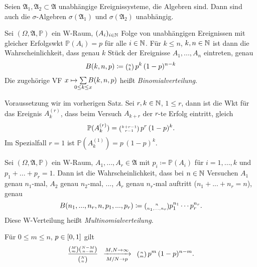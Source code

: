 \documentclass{cheat-sheet}
\newcommand{\Alg}{\mathfrak{A}} %
\renewcommand{\P}{\mathbb{P}} %
\let\myBinom\binom
\renewcommand{\binom}[2]{\mathsmaller{\myBinom{#1}{#2}}}
\begin{document}
\begin{satz}
  Seien $\Alg_1, \Alg_2 \subset \Alg$ unabhängige Ereignissysteme, die Algebren sind. Dann sind auch die $\sigma$-Algebren $\sigma(\Alg_1)$ und $\sigma(\Alg_2)$ unabhängig.
\end{satz}





\begin{satz}
  Sei $(\Omega, \Alg, \P)$ ein W-Raum, $(A_i)_{i \in \mathbb{N}}$ Folge von unabhängigen Ereignissen mit gleicher Erfolgswkt $\P(A_i) = p$ für alle $i \in \mathbb{N}$. Für $k \leq n$, $k, n \in \mathbb{N}$ ist dann die Wahrscheinlichkeit, dass genau $k$ Stück der Ereignisse $A_1, ..., A_n$ eintreten, genau
  \[ B(k, n, p) \coloneqq \binom{n}{k} \, p^k \, (1-p)^{n-k} \]
  Die zugehörige VF $x \mapsto \sum_{\mathclap{0 \leq k \leq x}} B(k,n,p)$ heißt \emph{Binomialverteilung}.
\end{satz}


\begin{lem}
  Voraussetzung wir im vorherigen Satz. Sei $r, k \in \mathbb{N}$, $1 \leq r$, dann ist die Wkt für das Ereignis $A_k^{(r)}$, dass beim Versuch $A_{k+r}$ der $r$-te Erfolg eintritt, gleich
  \[ \P(A_k^{(r)}) = \binom{k+r-1}{r-1} \, p^r \, (1-p)^k. \]
  Im Spezialfall $r = 1$ ist $\P(A_k^{(1)}) = p \, (1-p)^k$.
\end{lem}

\begin{satz}
  Sei $(\Omega, \Alg, \P)$ ein W-Raum, $A_1, ..., A_r \in \Alg$ mit $p_i \coloneqq \P(A_i)$ für $i = 1, ..., k$ und $p_1 + ... + p_r = 1$. Dann ist die Wahrscheinlichkeit, dass bei $n \in \mathbb{N}$ Versuchen $A_1$ genau $n_1$-mal, $A_2$ genau $n_2$-mal, ..., $A_r$ genau $n_r$-mal auftritt ($n_1 + ... + n_r = n$), genau
  \[ B(n_1, ..., n_r, n, p_1, ..., p_r) \coloneqq \binom{n}{n_1, ..., n_r} p_1^{n_1} \cdots p_r^{n_r}. \]
  Diese W-Verteilung heißt \emph{Multinomialverteilung}.
\end{satz}


\begin{satz}
  Für $0 \leq m \leq n$, $p \in \left[ 0, 1 \right]$ gilt
  \[ \frac{\binom{M}{m} \binom{N-M}{n-m}}{\binom{N}{n}} \enspace \xrightarrow[M/N \to p]{M, N \to \infty} \enspace \binom{n}{m} \, p^m \, (1-p)^{n-m}. \]
\end{satz}
\end{document}
